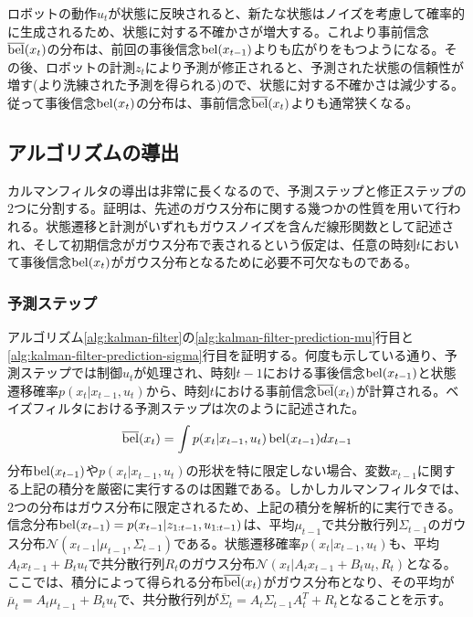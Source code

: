 \documentclass[dvipdfmx,a4paper]{jsarticle}
\begin{document}
ロボットの動作$u_t$が状態に反映されると、新たな状態はノイズを考慮して確率的に生成されるため、状態に対する不確かさが増大する。これより事前信念$\operatorname{\overline{bel}}(x_t)$の分布は、前回の事後信念$\operatorname{bel}(x_{t - 1})$よりも広がりをもつようになる。その後、ロボットの計測$z_t$により予測が修正されると、予測された状態の信頼性が増す(より洗練された予測を得られる)ので、状態に対する不確かさは減少する。従って事後信念$\operatorname{bel}(x_t)$の分布は、事前信念$\operatorname{\overline{bel}}(x_t)$よりも通常狭くなる。

\subsection{アルゴリズムの導出}
カルマンフィルタの導出は非常に長くなるので、予測ステップと修正ステップの2つに分割する。証明は、先述のガウス分布に関する幾つかの性質を用いて行われる。状態遷移と計測がいずれもガウスノイズを含んだ線形関数として記述され、そして初期信念がガウス分布で表されるという仮定は、任意の時刻$t$において事後信念$\operatorname{bel}(x_t)$がガウス分布となるために必要不可欠なものである。

\subsubsection{予測ステップ}
アルゴリズム\ref{alg:kalman-filter}の\ref{alg:kalman-filter-prediction-mu}行目と\ref{alg:kalman-filter-prediction-sigma}行目を証明する。何度も示している通り、予測ステップでは制御$u_t$が処理され、時刻$t - 1$における事後信念$\operatorname{bel}(x_{t - 1})$と状態遷移確率$p(x_t | x_{t - 1}, u_t)$から、時刻$t$における事前信念$\operatorname{\overline{bel}}(x_t)$が計算される。ベイズフィルタにおける予測ステップは次のように記述された。
\begin{equation}
	\operatorname{\overline{bel}}(x_t) = \int p(x_t | x_{t - 1}, u_t) \operatorname{bel}(x_{t - 1}) dx_{t - 1}
\end{equation}
分布$\operatorname{bel}(x_{t - 1})$や$p(x_t | x_{t - 1}, u_t)$の形状を特に限定しない場合、変数$x_{t - 1}$に関する上記の積分を厳密に実行するのは困難である。しかしカルマンフィルタでは、2つの分布はガウス分布に限定されるため、上記の積分を解析的に実行できる。信念分布$\operatorname{bel}(x_{t - 1}) = p(x_{t - 1} | z_{1 : t - 1}, u_{1 : t - 1})$は、平均$\mu_{t - 1}$で共分散行列$\Sigma_{t - 1}$のガウス分布$\mathcal{N}(x_{t - 1} | \mu_{t - 1}, \Sigma_{t - 1})$である。状態遷移確率$p(x_t | x_{t - 1}, u_t)$も、平均$A_t x_{t - 1} + B_t u_t$で共分散行列$R_t$のガウス分布$\mathcal{N}(x_t | A_t x_{t - 1} + B_t u_t, R_t)$となる。ここでは、積分によって得られる分布$\operatorname{\overline{bel}}(x_t)$がガウス分布となり、その平均が$\overline{\mu}_t = A_t \mu_{t - 1} + B_t u_t$で、共分散行列が$\overline{\Sigma}_t = A_t \Sigma_{t - 1} A_t^T + R_t$となることを示す。\newline
\end{document}
